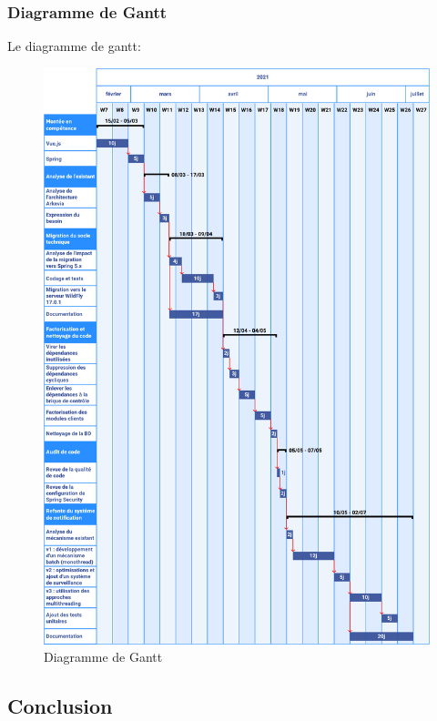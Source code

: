 \subsubsection{Diagramme de Gantt}
Le diagramme de gantt:\\
\begin{figure}[H]
    \begin{center}
        \includegraphics[width=\linewidth]{images/sec3/gantt.pdf}
        \caption{Diagramme de Gantt}
    \end{center}
\end{figure}
\subsection{Conclusion}
